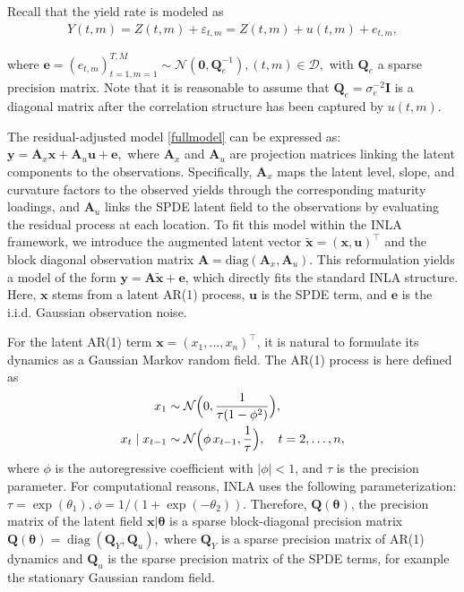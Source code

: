 \documentclass[
  12pt]{article}
\begin{document}
Recall that the yield rate is modeled as
\begin{align} \label{fullmodel}
Y(t,m) = Z(t,m) + \varepsilon_{t,m} = Z(t,m) + u(t,m) + e_{t,m},
\end{align}

where $\boldsymbol{e}=(e_{t,m})_{t=1,m=1}^{T,M} \sim \mathcal{N}(\boldsymbol{0}, \boldsymbol{Q}_e^{-1}), (t,m) \in \mathcal{D},$ with $\boldsymbol{Q}_e$ a sparse precision matrix. Note that it is reasonable to assume that $\boldsymbol{Q}_e = \sigma_e^{-2} \boldsymbol{I}$ is a diagonal matrix after the correlation structure has been captured by $u(t,m)$. 

The residual-adjusted model \eqref{fullmodel} can be expressed as: $\boldsymbol{y} = \boldsymbol{A}_x \boldsymbol{x}+ \boldsymbol{A}_u \boldsymbol{u} + \boldsymbol{e},$
where $\boldsymbol{A}_x$ and $\boldsymbol{A}_u$ are projection matrices linking the latent components to the observations. Specifically, $\boldsymbol{A}_x$ maps the latent level, slope, and curvature factors to the observed yields through the corresponding maturity loadings, and $\boldsymbol{A}_u$ links the SPDE latent field to the observations by evaluating the residual process at each location. To fit this model within the INLA framework, we introduce the augmented latent vector $\tilde{\boldsymbol{x}} = (\boldsymbol{x}, \boldsymbol{u})^{\top}$ and the block diagonal observation matrix $\boldsymbol{A} = \text{diag}(\boldsymbol{A}_x, \boldsymbol{A}_u)$. This reformulation yields a model of the form $\boldsymbol{y} = \boldsymbol{A}\tilde{\boldsymbol{x}} + \boldsymbol{e}$, which directly fits the standard INLA structure. Here, $\boldsymbol{x}$ stems from a latent AR(1) process, $\boldsymbol{u}$ is the SPDE term, and $\boldsymbol{e}$ is the i.i.d. Gaussian observation noise.

For the latent AR(1) term $\boldsymbol{x} = (x_1,\ldots,x_n)^\top$, it is natural to formulate its dynamics as a Gaussian Markov random field. The AR(1) process is here defined as
\begin{align*}
    x_1 &\sim \mathcal{N}\Bigl(0,\frac{1}{\tau(1-\phi^2)}\Bigr), \\
x_t \mid x_{t-1} &\sim \mathcal{N}\Bigl(\phi\, x_{t-1}, \frac{1}{\tau}\Bigr), \quad t=2,\dots,n,
\end{align*}
where $\phi$ is the autoregressive coefficient with $|\phi|<1$, and $\tau$ is the precision parameter. For computational reasons, INLA uses the following parameterization: $\tau = \exp(\theta_1), \phi = 1/(1+ \exp{(-\theta_2)})$. Therefore, $\boldsymbol{Q}(\boldsymbol{\theta})$, the precision matrix of the latent field $\boldsymbol{x} | \boldsymbol{\theta}$ is a sparse block-diagonal precision matrix $ \boldsymbol{Q}(\boldsymbol{\theta}) = \operatorname{diag}(\boldsymbol{Q}_Y, \boldsymbol{Q}_u),$
where $\boldsymbol{Q}_Y$ is a sparse precision matrix of AR(1) dynamics and $\boldsymbol{Q}_u$ is the sparse precision matrix of the SPDE terms, for example the stationary Gaussian random field. 
\end{document}
